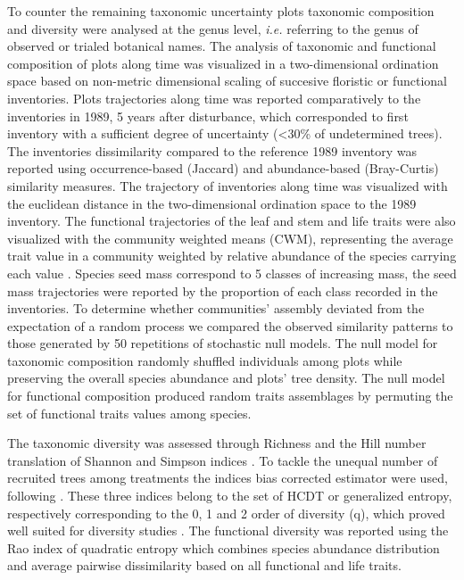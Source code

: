 \documentclass[fleqn,10pt]{ArtEcoFoG} %
\theoremstyle{definition}
\theoremstyle{definition}
\theoremstyle{definition}
\theoremstyle{remark}
\begin{document}
To counter the remaining taxonomic uncertainty plots taxonomic
composition and diversity were analysed at the genus level, \emph{i.e.}
referring to the genus of observed or trialed botanical names. The
analysis of taxonomic and functional composition of plots along time was
visualized in a two-dimensional ordination space based on non-metric
dimensional scaling of succesive floristic or functional inventories.
Plots trajectories along time was reported comparatively to the
inventories in 1989, 5 years after disturbance, which corresponded to
first inventory with a sufficient degree of uncertainty (\textless{}30\%
of undetermined trees). The inventories dissimilarity compared to the
reference 1989 inventory was reported using occurrence-based (Jaccard)
and abundance-based (Bray-Curtis) similarity measures. The trajectory of
inventories along time was visualized with the euclidean distance in the
two-dimensional ordination space to the 1989 inventory. The functional
trajectories of the leaf and stem and life traits were also visualized
with the community weighted means (CWM), representing the average trait
value in a community weighted by relative abundance of the species
carrying each value \citep{Diaz2007, Garnier2004}. Species seed mass
correspond to 5 classes of increasing mass, the seed mass trajectories
were reported by the proportion of each class recorded in the
inventories. To determine whether communities' assembly deviated from
the expectation of a random process we compared the observed similarity
patterns to those generated by 50 repetitions of stochastic null models.
The null model for taxonomic composition randomly shuffled individuals
among plots while preserving the overall species abundance and plots'
tree density. The null model for functional composition produced random
traits assemblages by permuting the set of functional traits values
among species.

The taxonomic diversity was assessed through Richness and the Hill
number translation of Shannon and Simpson indices \citep{Hill1973}. To
tackle the unequal number of recruited trees among treatments the
indices bias corrected estimator were used, following
\citep{chao2015estimating, Marcon2015b}. These three indices belong to
the set of HCDT or generalized entropy, respectively corresponding to
the 0, 1 and 2 order of diversity (q), which proved well suited for
diversity studies \citep{Patil1982, Tothmeresz1995}. The functional
diversity was reported using the Rao index of quadratic entropy which
combines species abundance distribution and average pairwise
dissimilarity based on all functional and life traits.
\end{document}
